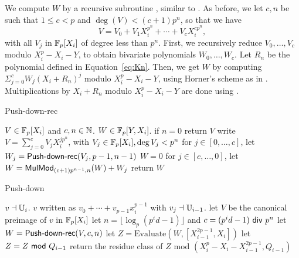 \smallskip 

We compute $W$ by a recursive subroutine , similar
to . As before, we let $c,n$ be such that $1\le c<p$ and
$\deg(V) < (c+1)p^n$, so that we have
$$V=V_0+ V_1X_i^{p^n}+\cdots+V_c X_i^{cp^n},$$ with all $V_j$ in
$\mathbb{F}_p[X_i]$ of degree less than $p^n$. First, we recursively reduce
$V_0,\dots,V_c$ modulo $X_i^p-X_i-Y$, to obtain bivariate
polynomials $W_0,\dots,W_{c}$. Let $R_n$ be the polynomial defined in
Equation~\eqref{eq:Kn}. Then, we get $W$ by computing
$\Sigma_{j=0}^c W_j(X_i+R_n)^j$ modulo $X_i^p-X_i-Y$,
using Horner's scheme as in . Multiplications by
$X_i+R_n$ modulo $X_i^p-X_i-Y$ are done using .

\begin{algorithm}
  \caption{Push-down-rec}
  \begin{algorithmic}[1]
    \REQUIRE $V\in \mathbb{F}_p[X_i]$ and $c,n\in\mathbb{N}$.
    \ENSURE $W \in\mathbb{F}_p[Y,X_i]$.
    \STATE if $n=0$ return $V$
    \STATE write $V=\sum_{j=0}^{c} V_j X_i^{jp^n}$, with $V_j \in \mathbb{F}_p[X_i], \deg V_j<p^n$
    \STATE for $j\in [0,\dots,c]$, let $W_j=\text{{\sf Push-down-rec}}(V_j,p-1,n-1)$
    \STATE $W=0$
    \STATE\label{pd:loop} for $j\in [c,\dots,0]$, let $W = {\sf MulMod}_{(c+1)p^{n-1},n}(W) + W_j$
    \STATE return $W$
  \end{algorithmic}
\end{algorithm}
\begin{algorithm}
  \caption{Push-down}
  \begin{algorithmic}[1]
    \REQUIRE $v\dashv \mathbb{U}_i$.
    \ENSURE $v$ written as $v_0+\cdots+v_{p-1}x_i^{p-1}$ with $v_j \dashv \mathbb{U}_{i-1}$.
    \STATE let $V$ be the canonical preimage of $v$ in $\mathbb{F}_p[X_i]$
    \STATE let $n=\lfloor \log_p(p^id-1) \rfloor$ and $c=(p^id-1){\sf~div~} p^n$
    \STATE let $W = \text{{\sf Push-down-rec}}(V,c,n)$
    \STATE let $Z = \text{Evaluate}(W,[X_{i-1}^{2p-1},X_i])$
    \STATE \label{step:pd:mod} let $Z = Z {\sf~mod~} Q_{i-1}$
    \STATE \label{step:pd:return} return the residue class of $Z$ mod $(X_i^p - X_i - X_{i-1}^{2p-1},Q_{i-1})$
  \end{algorithmic}
\end{algorithm}


